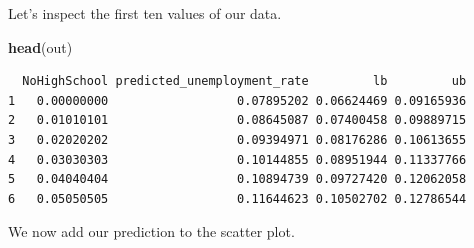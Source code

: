 \documentclass[]{article}
\newenvironment{Shaded}{\begin{snugshade}}{\end{snugshade}}
\newcommand{\DataTypeTok}[1]{\textcolor[rgb]{0.13,0.29,0.53}{#1}}
\newcommand{\DecValTok}[1]{\textcolor[rgb]{0.00,0.00,0.81}{#1}}
\newcommand{\FloatTok}[1]{\textcolor[rgb]{0.00,0.00,0.81}{#1}}
\newcommand{\KeywordTok}[1]{\textcolor[rgb]{0.13,0.29,0.53}{\textbf{#1}}}
\newcommand{\NormalTok}[1]{#1}
\newcommand{\OperatorTok}[1]{\textcolor[rgb]{0.81,0.36,0.00}{\textbf{#1}}}
\newcommand{\StringTok}[1]{\textcolor[rgb]{0.31,0.60,0.02}{#1}}
\begin{document}
\begin{Shaded}
\end{Shaded}

Let's inspect the first ten values of our data.

\begin{Shaded}
\begin{Highlighting}[]
\KeywordTok{head}\NormalTok{(out)}
\end{Highlighting}
\end{Shaded}

\begin{verbatim}
  NoHighSchool predicted_unemployment_rate         lb         ub
1   0.00000000                  0.07895202 0.06624469 0.09165936
2   0.01010101                  0.08645087 0.07400458 0.09889715
3   0.02020202                  0.09394971 0.08176286 0.10613655
4   0.03030303                  0.10144855 0.08951944 0.11337766
5   0.04040404                  0.10894739 0.09727420 0.12062058
6   0.05050505                  0.11644623 0.10502702 0.12786544
\end{verbatim}

We now add our prediction to the scatter plot.

\begin{Shaded}
\end{Shaded}
\end{document}
